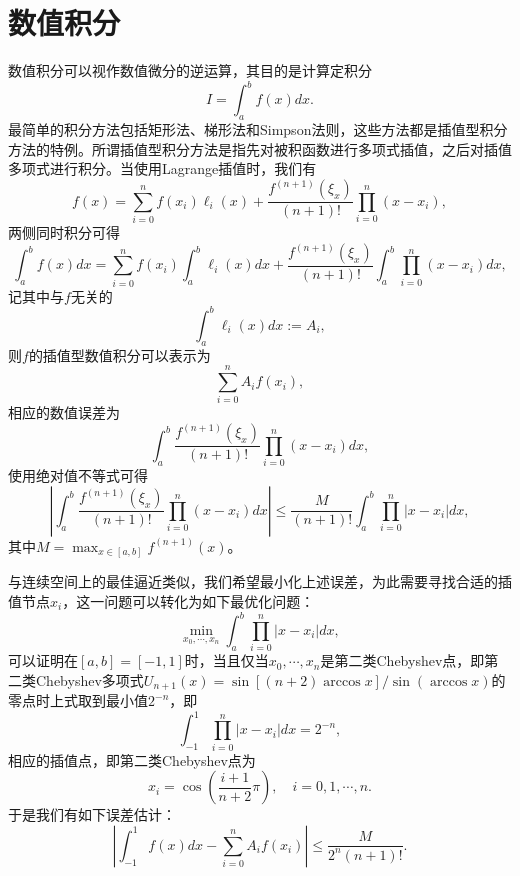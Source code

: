 \documentclass[a4paper,10pt]{ctexart}
\begin{document}
\section{数值积分}
数值积分可以视作数值微分的逆运算，其目的是计算定积分
\[
    I = \int_a^b f(x)dx.
\]
最简单的积分方法包括矩形法、梯形法和Simpson法则，这些方法都是插值型积分方法的特例。所谓插值型积分方法是指先对被积函数进行多项式插值，之后对插值多项式进行积分。当使用Lagrange插值时，我们有
\[
    f(x) = \sum_{i=0}^n f(x_i) \ell_i(x) + \frac{f^{(n+1)}(\xi_x)}{(n+1)!} \prod_{i=0}^n (x-x_i),
\]
两侧同时积分可得
\[
    \int_a^b f(x)dx = \sum_{i=0}^n f(x_i) \int_a^b \ell_i(x)dx + \frac{f^{(n+1)}(\xi_x)}{(n+1)!} \int_a^b \prod_{i=0}^n (x-x_i)dx,
\]
记其中与$ f $无关的
\begin{equation}
    \int_a^b \ell_i(x)dx :=A_i,
\end{equation}
则$ f $的插值型数值积分可以表示为
\begin{equation}
    \sum_{i=0}^n A_i f(x_i) ,
\end{equation}
相应的数值误差为
\begin{equation}
    \int_a^b\frac{f^{(n+1)}(\xi_x)}{(n+1)!} \prod_{i=0}^n (x-x_i)dx,
\end{equation}
使用绝对值不等式可得
\begin{equation}
    \left\vert \int_a^b\frac{f^{(n+1)}(\xi_x)}{(n+1)!} \prod_{i=0}^n (x-x_i)dx \right\vert \leqslant  \frac{M}{(n+1)!} \int_a^b \prod_{i=0}^n \vert x-x_i \vert dx,
\end{equation}
其中$ M = \max_{x\in [a,b]}f^{(n+1)}(x) $。

与连续空间上的最佳逼近类似，我们希望最小化上述误差，为此需要寻找合适的插值节点$ x_i $，这一问题可以转化为如下最优化问题：
\begin{equation}
    \min_{x_0,\cdots ,x_n}\int_a^b \prod_{i=0}^n \vert x-x_i \vert dx,
\end{equation}
可以证明在$ [a,b] = [-1,1] $时，当且仅当$ x_0,\cdots ,x_n $是第二类Chebyshev点，即第二类Chebyshev多项式$ U_{n+1}(x) = \sin[(n+2)\arccos x] / \sin (\arccos x) $的零点时上式取到最小值$ 2^{-n} $，即
\begin{equation}
    \int_{-1}^1 \prod_{i=0}^n \vert x-x_i \vert dx = 2^{-n},
\end{equation}
相应的插值点，即第二类Chebyshev点为
\begin{equation}
    x_i = \cos\left(\frac{i+1}{n+2}\pi\right),\quad i=0,1,\cdots ,n.
\end{equation}
于是我们有如下误差估计：
\begin{equation}
    \left\vert \int_{-1}^1 f(x)dx - \sum_{i=0}^n A_i f(x_i) \right\vert \leqslant \frac{M}{2^{n}(n+1)!}.
\end{equation}
\end{document}
